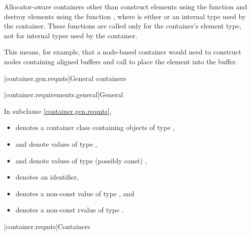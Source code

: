 \pnum
Allocator-aware containers
other than  construct elements using the function
and destroy elements using the function
,
where  is either  or
an internal type used by the container.
These functions are called only for the
container's element type, not for internal types used by the container.
\begin{note}
This
means, for example, that a node-based container would need to construct nodes containing
aligned buffers and call  to place the element into the buffer.
\end{note}

[container.gen.reqmts]{General containers}

[container.requirements.general]{General}

\pnum
In subclause \ref{container.gen.reqmts},
\begin{itemize}
\item
{} denotes a container class containing objects of type ,
\item
{} and  denote values of type ,
\item
{} and  denote values of type (possibly const) ,
\item
{} denotes an identifier,
\item
{} denotes a non-const value of type , and
\item
{} denotes a non-const rvalue of type .
\end{itemize}

[container.reqmts]{Containers}

\newcommand{\indexcont}[1]{%
\indexlibrarymisc{\idxcode{#1}}{containers}%
\indexlibrarymemberx{array}{#1}%
\indexlibrarymemberx{deque}{#1}%
\indexlibrarymemberx{forward_list}{#1}%
\indexlibrarymemberx{list}{#1}%
\indexlibrarymemberx{vector}{#1}%
\indexlibrarymemberx{map}{#1}%
\indexlibrarymemberx{set}{#1}%
\indexlibrarymemberx{multiset}{#1}%
\indexlibrarymemberx{multimap}{#1}%
\indexlibrarymemberx{unordered_map}{#1}%
\indexlibrarymemberx{unordered_set}{#1}%
\indexlibrarymemberx{unordered_multiset}{#1}%
\indexlibrarymemberx{unordered_multimap}{#1}%
}

